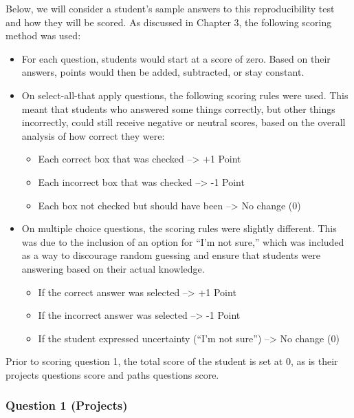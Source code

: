 \documentclass[12pt,twoside]{reedthesis}
\providecommand{\tightlist}{%
  \setlength{\itemsep}{0pt}\setlength{\parskip}{0pt}}
\begin{document}
Below, we will consider a student's sample answers to this reproducibility test and how they will be scored. As discussed in Chapter 3, the following scoring method was used:
\begin{itemize}
\item
  For each question, students would start at a score of zero. Based on their answers, points would then be added, subtracted, or stay constant.
\item
  On select-all-that apply questions, the following scoring rules were used. This meant that students who answered some things correctly, but other things incorrectly, could still receive negative or neutral scores, based on the overall analysis of how correct they were:
  \begin{itemize}
  \tightlist
  \item
    Each correct box that was checked --\textgreater{} +1 Point
  \item
    Each incorrect box that was checked --\textgreater{} -1 Point
  \item
    Each box not checked but should have been --\textgreater{} No change (0)
  \end{itemize}
\item
  On multiple choice questions, the scoring rules were slightly different. This was due to the inclusion of an option for ``I'm not sure,'' which was included as a way to discourage random guessing and ensure that students were answering based on their actual knowledge.
  \begin{itemize}
  \tightlist
  \item
    If the correct answer was selected --\textgreater{} +1 Point
  \item
    If the incorrect answer was selected --\textgreater{} -1 Point
  \item
    If the student expressed uncertainty (``I'm not sure'') --\textgreater{} No change (0)
  \end{itemize}
\end{itemize}
Prior to scoring question 1, the total score of the student is set at 0, as is their projects questions score and paths questions score.

\hypertarget{question-1-projects-1}{%
\subsubsection{Question 1 (Projects)}\label{question-1-projects-1}}
\end{document}
